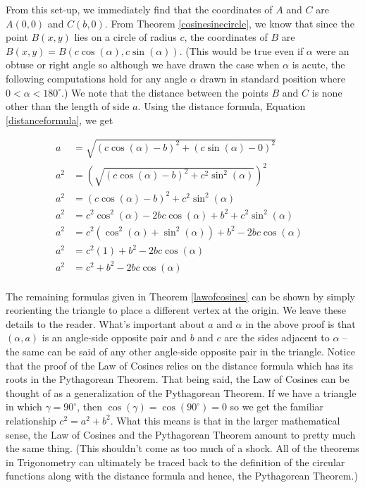 \medskip

From this set-up, we immediately find that the coordinates of $A$ and $C$ are $A(0,0)$ and $C(b,0)$.  From Theorem \ref{cosinesinecircle}, we know that since the point $B(x,y)$ lies on a circle of radius $c$, the coordinates of $B$ are $B(x,y) = B(c \cos(\alpha), c \sin(\alpha))$.  (This would be true even if $\alpha$ were an obtuse or right angle so although we have drawn the case when $\alpha$ is acute, the following computations hold for any angle $\alpha$ drawn in standard position where $0 < \alpha < 180^{\circ}$.)  We note that the distance between the points $B$ and $C$ is none other than the length of side $a$.  Using the distance formula, Equation \ref{distanceformula}, we get

\begin{align*}
a & =  \sqrt{(c \cos(\alpha) - b)^{2} + (c \sin(\alpha) - 0)^2} & \\
a^{2} & =  \left(\sqrt{(c \cos(\alpha) - b)^{2} + c^2 \sin^2(\alpha)}\right)^2  \\
a^2 & =   (c \cos(\alpha) - b)^{2} + c^2 \sin^2(\alpha) \\
a^2 & =  c^2 \cos^2(\alpha) - 2bc \cos(\alpha) + b^2 + c^2 \sin^2(\alpha) \\
a^2 & =  c^2\left(\cos^2(\alpha) + \sin^2(\alpha)\right) + b^2 - 2bc \cos(\alpha) \\
a^2 & =  c^2(1) + b^2 - 2bc \cos(\alpha)  \tag*{Since $\cos^2(\alpha) + \sin^2(\alpha) = 1$}\\
a^2 & =  c^2 + b^2 - 2bc \cos(\alpha) \\
\end{align*}

The remaining formulas given in Theorem \ref{lawofcosines} can be shown by simply reorienting the triangle to place a different vertex at the origin.  We leave these details to the reader.  What's important about $a$ and $\alpha$ in the above proof is that $(\alpha,a)$ is an angle-side opposite pair and $b$ and $c$ are the sides adjacent to $\alpha$ -- the same can be said of any other angle-side opposite pair in the triangle.   Notice that the proof of the Law of Cosines relies on the distance formula which has its roots in the Pythagorean Theorem.  That being said, the Law of Cosines can be thought of as a generalization of the Pythagorean Theorem.  If we have a triangle in which $\gamma = 90^{\circ}$, then $\cos(\gamma) = \cos\left(90^{\circ}\right) = 0$ so we get the familiar relationship  $c^2 = a^2 + b^2$.  What this means is that in the larger mathematical sense, the Law of Cosines and the Pythagorean Theorem amount to pretty much the same thing. (This shouldn't come as too much of a shock.  All of the theorems in Trigonometry can ultimately be traced back to the definition of the circular functions along with the distance formula and hence, the Pythagorean Theorem.)

